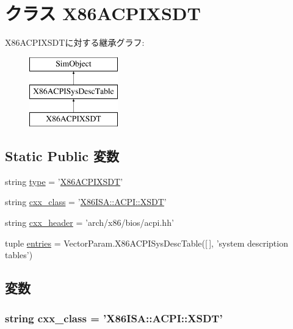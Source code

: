 \hypertarget{classACPI_1_1X86ACPIXSDT}{
\section{クラス X86ACPIXSDT}
\label{classACPI_1_1X86ACPIXSDT}
}
X86ACPIXSDTに対する継承グラフ:\begin{figure}[H]
\begin{center}
\leavevmode
\includegraphics[height=3cm]{classACPI_1_1X86ACPIXSDT}
\end{center}
\end{figure}
\subsection*{Static Public 変数}
\begin{DoxyCompactItemize}
\item 
string \hyperlink{classACPI_1_1X86ACPIXSDT_acce15679d830831b0bbe8ebc2a60b2ca}{type} = '\hyperlink{classACPI_1_1X86ACPIXSDT}{X86ACPIXSDT}'
\item 
string \hyperlink{classACPI_1_1X86ACPIXSDT_a58cd55cd4023648e138237cfc0822ae3}{cxx\_\-class} = '\hyperlink{classX86ISA_1_1ACPI_1_1XSDT}{X86ISA::ACPI::XSDT}'
\item 
string \hyperlink{classACPI_1_1X86ACPIXSDT_a17da7064bc5c518791f0c891eff05fda}{cxx\_\-header} = 'arch/x86/bios/acpi.hh'
\item 
tuple \hyperlink{classACPI_1_1X86ACPIXSDT_aa7b3bf5cf82e2cb9b7cea7a35c454576}{entries} = VectorParam.X86ACPISysDescTable(\mbox{[}$\,$\mbox{]}, 'system description tables')
\end{DoxyCompactItemize}


\subsection{変数}
\hypertarget{classACPI_1_1X86ACPIXSDT_a58cd55cd4023648e138237cfc0822ae3}{
\subsubsection[{cxx\_\-class}]{\setlength{\rightskip}{0pt plus 5cm}string {\bf cxx\_\-class} = '{\bf X86ISA::ACPI::XSDT}'}}
\label{classACPI_1_1X86ACPIXSDT_a58cd55cd4023648e138237cfc0822ae3}


